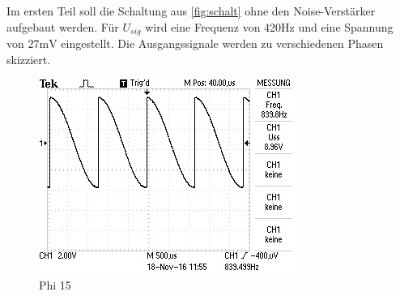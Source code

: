 Im ersten Teil soll die Schaltung aus \ref{fig:schalt} ohne den Noise-Verstärker
aufgebaut werden. Für $U_{sig}$ wird eine Frequenz von 420$\si{\hertz}$ und eine
Spannung von $27\si{\milli\volt}$ eingestellt. Die Ausgangssignale werden zu
verschiedenen Phasen skizziert.
\begin{figure}
  \centering
  \includegraphics{Bilder/15.jpeg}
  \caption{Phi 15}
  \label{fig:15}
\end{figure}
